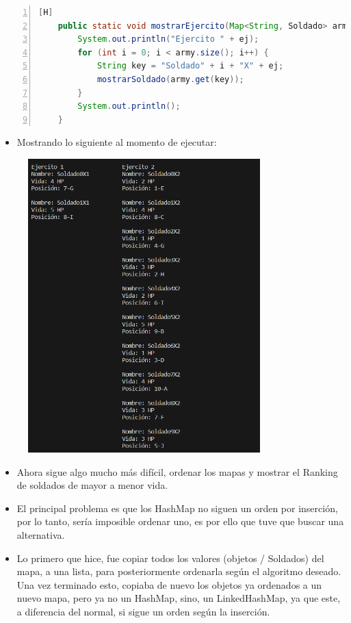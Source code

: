 \documentclass{article}
\begin{document}
	\begin{lstlisting}[language=java,caption={Mostrando el ejército}, numbers=left][H]
	public static void mostrarEjercito(Map<String, Soldado> army, int ej) {
        System.out.println("Ejercito " + ej);
        for (int i = 0; i < army.size(); i++) {
            String key = "Soldado" + i + "X" + ej;
            mostrarSoldado(army.get(key));
        }
        System.out.println();
    }
	\end{lstlisting}
	\begin{itemize}	
		\item Mostrando lo siguiente al momento de ejecutar:
	\end{itemize}
	
	\begin{figure}[H]
		\centering
	\includegraphics[width=0.8\textwidth,keepaspectratio]{img/captura3.png}
	\end{figure}
	
	\begin{itemize}	
		\item Ahora sigue algo mucho más difícil, ordenar los mapas y mostrar el Ranking de soldados de mayor a menor vida.
		\item El principal problema es que los HashMap no siguen un orden por inserción, por lo tanto, sería imposible ordenar uno, es por ello que tuve que buscar una alternativa.
		\item Lo primero que hice, fue copiar todos los valores (objetos / Soldados) del mapa, a una lista, para posteriormente ordenarla según el algoritmo deseado. Una vez terminado esto, copiaba de nuevo los objetos ya ordenados a un nuevo mapa, pero ya no un HashMap, sino, un LinkedHashMap, ya que este, a diferencia del normal, si sigue un orden según la inserción.
	\end{itemize}
	
\end{document}
